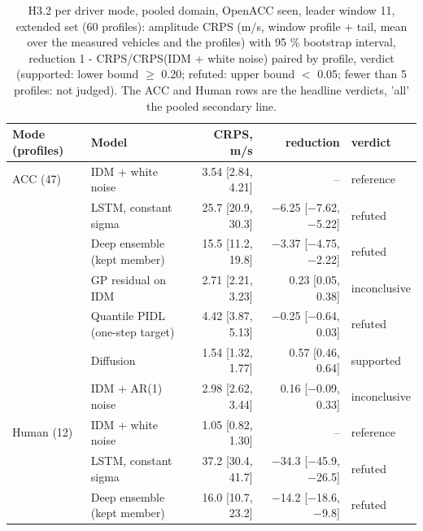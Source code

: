 \begin{table}[htbp]
\centering
\small
\caption{H3.2 per driver mode, pooled domain, OpenACC seen, leader window 11, extended set (60 profiles): amplitude CRPS (m/s, window profile + tail, mean over the measured vehicles and the profiles) with 95 \% bootstrap interval, reduction 1 - CRPS/CRPS(IDM + white noise) paired by profile, verdict (supported: lower bound $\geq$ 0.20; refuted: upper bound $<$ 0.05; fewer than 5 profiles: not judged). The ACC and Human rows are the headline verdicts, 'all' the pooled secondary line.}
\label{tab:t5-h32--e3--pool-w11}
\begin{tabular}{llrrl}
\toprule
Mode (profiles) & Model & CRPS, m/s & reduction & verdict \\
\midrule
ACC (47) & IDM + white noise & 3.54 [2.84, 4.21] & -- & reference \\
 & LSTM, constant sigma & 25.7 [20.9, 30.3] & $-$6.25 [$-$7.62, $-$5.22] & refuted \\
 & Deep ensemble (kept member) & 15.5 [11.2, 19.8] & $-$3.37 [$-$4.75, $-$2.22] & refuted \\
 & GP residual on IDM & 2.71 [2.21, 3.23] & 0.23 [0.05, 0.38] & inconclusive \\
 & Quantile PIDL (one-step target) & 4.42 [3.87, 5.13] & $-$0.25 [$-$0.64, 0.03] & refuted \\
 & Diffusion & 1.54 [1.32, 1.77] & 0.57 [0.46, 0.64] & supported \\
 & IDM + AR(1) noise & 2.98 [2.62, 3.44] & 0.16 [$-$0.09, 0.33] & inconclusive \\
\midrule
Human (12) & IDM + white noise & 1.05 [0.82, 1.30] & -- & reference \\
 & LSTM, constant sigma & 37.2 [30.4, 41.7] & $-$34.3 [$-$45.9, $-$26.5] & refuted \\
 & Deep ensemble (kept member) & 16.0 [10.7, 23.2] & $-$14.2 [$-$18.6, $-$9.8] & refuted \\

\end{tabular}
\end{table}
